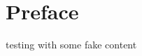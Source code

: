 \documentclass[../../templates/chapter]{subfiles}
\begin{document}
\chapter*{Preface}\label{chap:00-preface}

testing with some fake content
\end{document}
